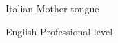 
\begin{cvskills}
  \cvskill
    {Italian} %
    {Mother tongue} %

  \cvskill
    {English} %
    {Professional level} %
\end{cvskills}